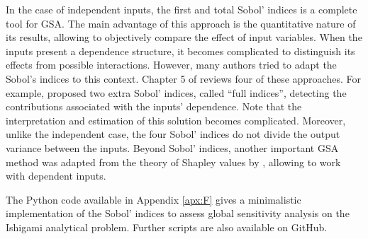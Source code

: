 In the case of independent inputs, the first and total Sobol' indices is a complete tool for GSA. 
The main advantage of this approach is the quantitative nature of its results, allowing to objectively compare the effect of input variables. 
When the inputs present a dependence structure, it becomes complicated to distinguish its effects from possible interactions. 
However, many authors tried to adapt the Sobol's indices to this context. 
Chapter 5 of \citet{daveiga_iooss_2021} reviews four of these approaches. 
For example, \citet{mara_tarantola_2012} proposed two extra Sobol' indices, called ``full indices'', detecting the contributions associated with the inputs' dependence. 
Note that the interpretation and estimation of this solution becomes complicated. 
Moreover, unlike the independent case, the four Sobol' indices do not divide the output variance between the inputs. 
Beyond Sobol' indices, another important GSA method was adapted from the theory of Shapley values by \citet{owen_2014_shapley}, allowing to work with dependent inputs.   

\begin{otexample}
    The Python code available in Appendix \ref{apx:F} gives a minimalistic \ot implementation of the Sobol' indices to assess global sensitivity analysis on the Ishigami analytical problem.
    Further scripts are also available on GitHub\footnotemark.  
\end{otexample}

